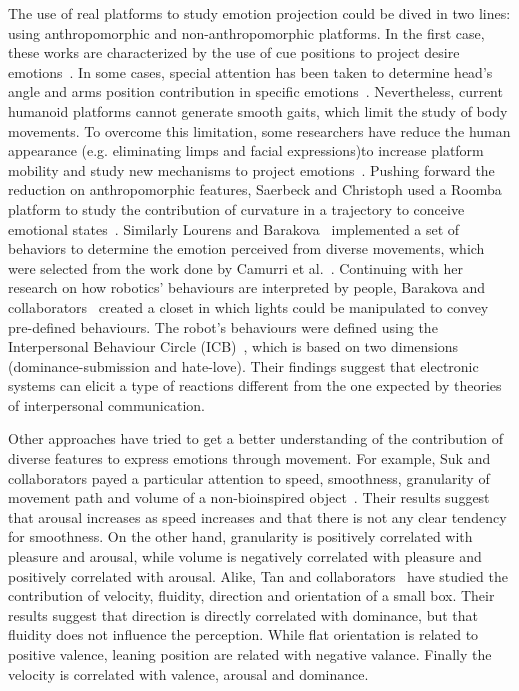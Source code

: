 The use of real platforms to study emotion projection could be dived in two lines: using anthropomorphic and non-anthropomorphic platforms. In the first case, these works are characterized by the use of cue positions to project desire emotions~\cite{NAO2013}. In some cases, special attention has been taken to determine head's angle and arms position contribution in specific emotions~\cite{Brown2014}. 
Nevertheless, current humanoid platforms cannot generate smooth gaits, which limit the study of body movements. To overcome this limitation, some researchers have reduce the human appearance (e.g. eliminating limps and facial expressions)to increase platform mobility and study new mechanisms to project emotions~\cite{Arras2012}. Pushing forward the reduction on anthropomorphic features, Saerbeck and Christoph used a Roomba platform to study the contribution of curvature in a trajectory to conceive emotional states~\cite{Saerbeck2010}. Similarly Lourens and Barakova~\cite{BarakovaL10} implemented a set of behaviors to determine the emotion  perceived from diverse movements, which were selected from the  work done by Camurri et al.~\cite{pop00002}. Continuing with her research on how robotics' behaviours are interpreted by people, Barakova and collaborators~\cite{Barakova2013} created a closet in which lights could be manipulated to convey pre-defined behaviours. The robot's behaviours were defined using the Interpersonal Behaviour Circle (ICB)~\cite{Leary57}, which is based on two dimensions (dominance-submission and hate-love). Their findings suggest that electronic systems can elicit a type of reactions different from the one expected by theories of interpersonal communication.

Other approaches have tried to get a better understanding of the contribution of diverse features to express emotions through movement. For example, Suk and collaborators payed a particular attention to speed, smoothness, granularity of movement path and volume of a non-bioinspired object~\cite{NAM2014}. Their results suggest that arousal increases as speed increases and that there is not any clear tendency for smoothness. On the other hand, granularity is positively correlated with pleasure and arousal, while volume is negatively correlated with pleasure and positively correlated with arousal. Alike, Tan and collaborators~\cite{Tan2016} have studied the contribution of velocity, fluidity, direction and orientation of a small box. Their results suggest that direction is directly correlated with dominance, but that fluidity does not influence the perception. While flat orientation is related to positive valence, leaning position are related with negative valance. Finally the velocity is correlated with valence, arousal and dominance.  

